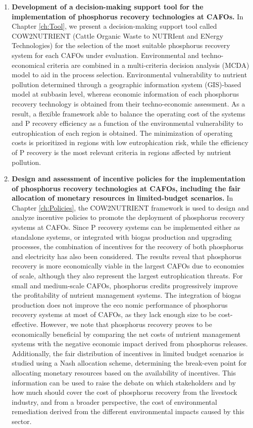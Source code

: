 \begin{enumerate}[font=\bfseries]
	\item \textbf{Development of a decision-making support tool for the implementation of phosphorus recovery technologies at CAFOs.} In Chapter \ref{ch:Tool}, we present a decision-making support tool called  COW2NUTRIENT (Cattle Organic
	Waste to NUTRIent and ENergy Technologies) for the
	selection of the most suitable phosphorus recovery system for each CAFOs under evaluation. Environmental and techno-economical criteria are combined in a multi-criteria decision analysis
	(MCDA) model to aid in the process selection. Environmental vulnerability to nutrient pollution determined through a geographic information system (GIS)-based model at subbasin level, whereas economic information of each phosphorus recovery technology is obtained from their techno-economic assessment. As a result, a flexible framework able to balance the operating cost of the systems and
	P recovery efficiency as a function of the environmental vulnerability to
	eutrophication of each region is obtained. The minimization of operating costs is
	prioritized in regions with low eutrophication risk, while the efficiency
	of P recovery is the most relevant criteria in regions affected by nutrient
	pollution.
	
	
	\item \textbf{Design and assessment of incentive policies for the implementation of phosphorus recovery technologies at CAFOs, including the fair allocation of monetary resources in limited-budget scenarios.} In Chapter \ref{ch:Policies}, the COW2NUTRIENT framework is used to design and analyze incentive policies to promote the deployment of phosphorus recovery systems at CAFOs.  Since P recovery systems can be implemented either as standalone systems, or integrated with biogas production and upgrading processes, the combination of incentives for the recovery	of both phosphorus and electricity has also been considered. The results reveal that phosphorus recovery is more economically viable in the largest CAFOs due to economies of scale, although they also represent the largest eutrophication threats. For small and medium-scale CAFOs, phosphorus credits progressively improve the	profitability of nutrient management systems. The integration of biogas production does not improve the eco­
	nomic performance of phosphorus recovery systems at most of CAFOs, as they lack enough size to be cost-effective. However, we note that phosphorus recovery proves to be economically beneficial by comparing the net costs of nutrient management systems with the negative economic impact derived from phosphorus releases. Additionally, the fair distribution of incentives in limited budget scenarios is studied	using a Nash allocation scheme, determining the break-even point for allocating monetary resources based on the
	availability of incentives. This information can be used to raise the
	debate on which stakeholders and by how much should cover the cost of phosphorus recovery from the livestock industry, and from a broader perspective, the cost of environmental remediation derived from the
	different environmental impacts caused by this sector.
	

\end{enumerate}

